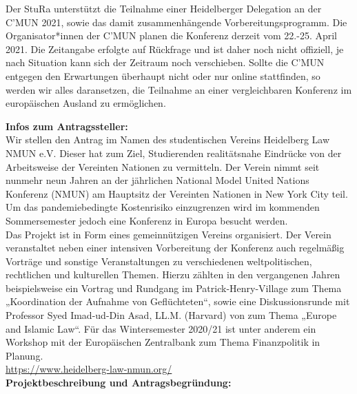 {
    Der StuRa unterstützt die Teilnahme einer Heidelberger Delegation an der C’MUN 2021, sowie das damit zusammenhängende Vorbereitungsprogramm. Die Organisator*innen der C’MUN planen die Konferenz derzeit vom 22.-25. April 2021. Die Zeitangabe erfolgte auf Rückfrage und ist daher noch nicht offiziell, je nach Situation kann sich der Zeitraum noch verschieben. Sollte die C’MUN entgegen den Erwartungen überhaupt nicht oder nur online stattfinden, so werden wir alles daransetzen, die Teilnahme an einer vergleichbaren Konferenz im europäischen Ausland zu ermöglichen.

}{
    \textbf{Infos zum Antragssteller:}\\
    Wir stellen den Antrag im Namen des studentischen Vereins Heidelberg Law NMUN e.V. Dieser hat zum Ziel, Studierenden realitätsnahe Eindrücke von der Arbeitsweise der Vereinten Nationen zu vermitteln. Der Verein nimmt seit nunmehr neun Jahren an der jährlichen National Model United Nations Konferenz (NMUN) am Hauptsitz der Vereinten Nationen in New York City teil. Um das pandemiebedingte Kostenrisiko einzugrenzen wird im kommenden Sommersemester jedoch eine Konferenz in Europa besucht werden.\\
    Das Projekt ist in Form eines gemeinnützigen Vereins organisiert. Der Verein veranstaltet neben einer intensiven Vorbereitung der Konferenz auch regelmäßig Vorträge und sonstige Veranstaltungen zu verschiedenen weltpolitischen, rechtlichen und kulturellen Themen. Hierzu zählten in den vergangenen Jahren beispielsweise ein Vortrag und Rundgang im Patrick-Henry-Village zum Thema „Koordination der Aufnahme von Geflüchteten“, sowie eine Diskussionsrunde mit Professor Syed Imad-ud-Din Asad, LL.M. (Harvard) von zum Thema „Europe and Islamic Law“. Für das Wintersemester 2020/21 ist unter anderem ein Workshop mit der Europäischen Zentralbank zum Thema Finanzpolitik in Planung.\\
    \url{https://www.heidelberg-law-nmun.org/}\\[1em]
    \textbf{Projektbeschreibung und Antragsbegründung:}\\
    \begin{enumerate}

\end{enumerate}}
